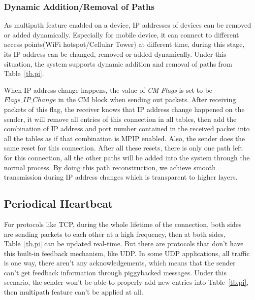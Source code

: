 

\subsubsection{Dynamic Addition/Removal of Paths}
\label{sec:switch}

As multipath feature enabled on a device, IP addresses of devices can be removed or added dynamically. Especially for mobile device, it can connect to different access points(WiFi hotspot/Cellular Tower) at different time, during this stage, its IP address can be changed, removed or added dynamically. Under this situation, the system supports dynamic addition and removal of paths from Table~\ref{tb.pi}.

When IP address change happens, the value of \emph{CM Flags} is set to be $Flags\_IP\_Change$ in the CM block when sending out packets. After receiving packets of this flag, the receiver knows that IP address change happened on the sender, it will remove all entries of this connection in all tables, then add the combination of IP address and port number contained in the received packet into all the tables as if that combination is MPIP enabled.
Also, the sender does the same reset for this connection. After all these resets, there is only one path left for this connection, all the other paths will be added into the system through the normal process. By doing this path reconstruction, we achieve smooth transmission during IP address changes which is transparent to higher layers.


\subsection{Periodical Heartbeat}

For protocols like TCP, during the whole lifetime of the connection, both sides are sending packets to each other at a high frequency, then at both sides, Table~\ref{tb.pi} can be updated real-time. But there are protocols that don't have this built-in feedback mechanism, like UDP. In some UDP applications, all traffic is one way, there aren't any acknowledgements, which means that the sender can't get feedback information through piggybacked messages. Under this scenario, the sender won't be able to properly add new entries into Table~\ref{tb.pi}, then multipath feature can't be applied at all. 

